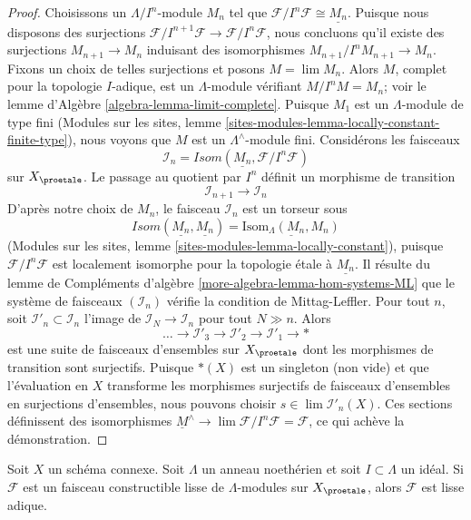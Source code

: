 \begin{proof}
Choisissons un $\Lambda/I^n$-module $M_n$ tel que
$\mathcal{F}/I^n\mathcal{F} \cong \underline{M_n}$.
Puisque nous disposons des surjections
$\mathcal{F}/I^{n + 1}\mathcal{F} \to \mathcal{F}/I^n\mathcal{F}$,
nous concluons qu'il existe des
surjections $M_{n + 1} \to M_n$ induisant des isomorphismes
$M_{n + 1}/I^nM_{n + 1} \to M_n$. Fixons un choix de telles surjections
et posons $M = \lim M_n$. Alors $M$, complet pour la topologie $I$-adique,
est un $\Lambda$-module vérifiant $M/I^nM = M_n$; voir le
lemme d'Algèbre \ref{algebra-lemma-limit-complete}.
Puisque $M_1$ est un $\Lambda$-module de type fini
(Modules sur les sites, lemme
\ref{sites-modules-lemma-locally-constant-finite-type}),
nous voyons que $M$ est un $\Lambda^\wedge$-module fini.
Considérons les faisceaux
$$
\mathcal{I}_n = \mathit{Isom}(\underline{M_n}, \mathcal{F}/I^n\mathcal{F})
$$
sur $X_\proetale$. Le passage au quotient par $I^n$ définit un morphisme de transition
$$
\mathcal{I}_{n + 1} \longrightarrow \mathcal{I}_n
$$
D'après notre choix de $M_n$, le faisceau $\mathcal{I}_n$ est un torseur sous
$$
\mathit{Isom}(\underline{M_n}, \underline{M_n}) =
\underline{\text{Isom}_\Lambda(M_n, M_n)}
$$
(Modules sur les sites, lemme \ref{sites-modules-lemma-locally-constant}),
puisque $\mathcal{F}/I^n\mathcal{F}$ est localement isomorphe pour la topologie \'etale
à $\underline{M_n}$. Il résulte du
lemme de Compléments d'algèbre \ref{more-algebra-lemma-hom-systems-ML}
que le système de faisceaux $(\mathcal{I}_n)$ vérifie la condition de Mittag-Leffler.
Pour tout $n$, soit $\mathcal{I}'_n \subset \mathcal{I}_n$ l'image
de $\mathcal{I}_N \to \mathcal{I}_n$ pour tout $N \gg n$.
Alors
$$
\ldots \to \mathcal{I}'_3 \to \mathcal{I}'_2 \to \mathcal{I}'_1 \to *
$$
est une suite de faisceaux d'ensembles sur $X_\proetale$ dont les morphismes de
transition sont surjectifs. Puisque $*(X)$ est un singleton (non vide)
et que l'évaluation en $X$ transforme les morphismes surjectifs de faisceaux d'ensembles
en surjections d'ensembles, nous pouvons choisir
$s \in \lim \mathcal{I}'_n(X)$. Ces sections définissent des isomorphismes
$\underline{M}^\wedge \to \lim \mathcal{F}/I^n\mathcal{F} = \mathcal{F}$,
ce qui achève la démonstration.
\end{proof}

\begin{lemma}
\label{lemma-connected-lisse}
Soit $X$ un schéma connexe. Soit $\Lambda$ un anneau noethérien et soit
$I \subset \Lambda$ un idéal. Si $\mathcal{F}$ est un faisceau constructible lisse
de $\Lambda$-modules sur $X_\proetale$, alors $\mathcal{F}$
est lisse adique.
\end{lemma}

